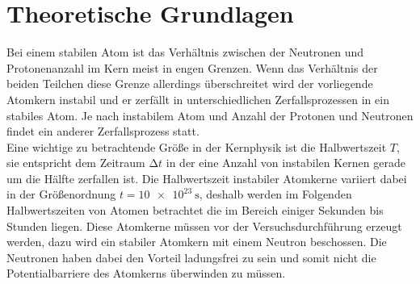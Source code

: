 \section{Theoretische Grundlagen}

Bei einem stabilen Atom ist das Verhältnis zwischen der Neutronen und Protonenanzahl im Kern meist in engen Grenzen.
Wenn das Verhältnis der beiden Teilchen diese Grenze allerdings überschreitet wird der vorliegende Atomkern instabil und er zerfällt in 
unterschiedlichen Zerfallsprozessen in ein stabiles Atom. Je nach instabilem Atom und Anzahl der Protonen und Neutronen findet ein anderer
Zerfallsprozess statt.
\\
\newline
Eine wichtige zu betrachtende Größe in der Kernphysik ist die Halbwertszeit $T$, sie entspricht dem Zeitraum $\increment t$ in der eine Anzahl von instabilen
Kernen gerade um die Hälfte zerfallen ist. Die Halbwertszeit instabiler Atomkerne variiert dabei in der Größenordnung 
$t = \SI{10e23}{\second}$, deshalb werden im Folgenden Halbwertszeiten von Atomen betrachtet die im Bereich einiger Sekunden bis Stunden liegen.
Diese Atomkerne müssen vor der Versuchsdurchführung erzeugt werden, dazu wird ein stabiler Atomkern mit einem Neutron beschossen. Die Neutronen haben dabei
den Vorteil ladungsfrei zu sein und somit nicht die Potentialbarriere des Atomkerns überwinden zu müssen.

